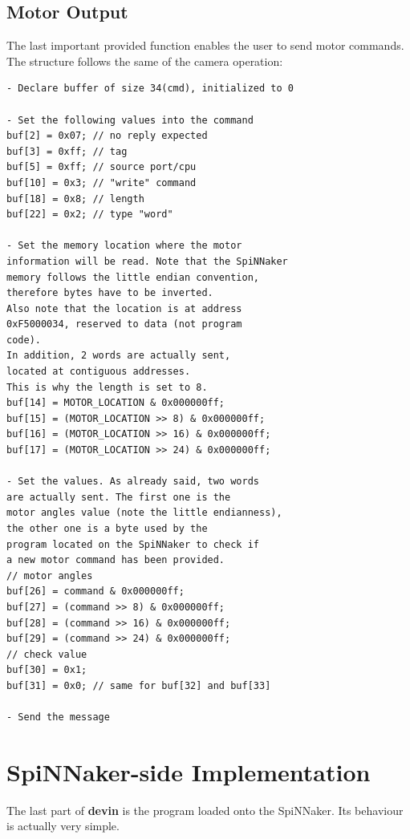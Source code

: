 \documentclass{article}
\begin{document}
\subsection{Motor Output}
The last important provided function enables the user to send motor commands. The structure follows the same of the camera operation:
\begin{verbatim}
- Declare buffer of size 34(cmd), initialized to 0

- Set the following values into the command
buf[2] = 0x07; // no reply expected
buf[3] = 0xff; // tag
buf[5] = 0xff; // source port/cpu
buf[10] = 0x3; // "write" command
buf[18] = 0x8; // length
buf[22] = 0x2; // type "word"

- Set the memory location where the motor
information will be read. Note that the SpiNNaker
memory follows the little endian convention,
therefore bytes have to be inverted.
Also note that the location is at address
0xF5000034, reserved to data (not program
code).
In addition, 2 words are actually sent,
located at contiguous addresses.
This is why the length is set to 8.
buf[14] = MOTOR_LOCATION & 0x000000ff;
buf[15] = (MOTOR_LOCATION >> 8) & 0x000000ff;
buf[16] = (MOTOR_LOCATION >> 16) & 0x000000ff;
buf[17] = (MOTOR_LOCATION >> 24) & 0x000000ff;

- Set the values. As already said, two words
are actually sent. The first one is the 
motor angles value (note the little endianness),
the other one is a byte used by the
program located on the SpiNNaker to check if
a new motor command has been provided.
// motor angles
buf[26] = command & 0x000000ff;
buf[27] = (command >> 8) & 0x000000ff;
buf[28] = (command >> 16) & 0x000000ff;
buf[29] = (command >> 24) & 0x000000ff;
// check value
buf[30] = 0x1;
buf[31] = 0x0; // same for buf[32] and buf[33]

- Send the message
\end{verbatim}

\section{SpiNNaker-side Implementation}
The last part of \textbf{devin} is the program loaded onto the SpiNNaker. Its behaviour is actually very simple. \\
\end{document}
